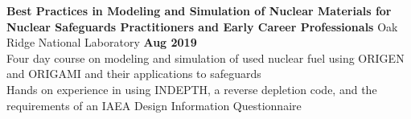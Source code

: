 \documentclass[margin,line]{resume}
\begin{document}
\begin{resume}
    \textbf{Best Practices in Modeling and Simulation of Nuclear Materials for Nuclear Safeguards Practitioners and Early Career Professionals} 
    Oak Ridge National Laboratory \hfill \textbf{Aug 2019} \\
    Four day course on modeling and simulation of used nuclear fuel using ORIGEN and ORIGAMI and their applications to safeguards \\
    Hands on experience in using INDEPTH, a reverse depletion code, and the requirements of an IAEA Design Information Questionnaire \\ 
    





\end{resume}
\end{document}
